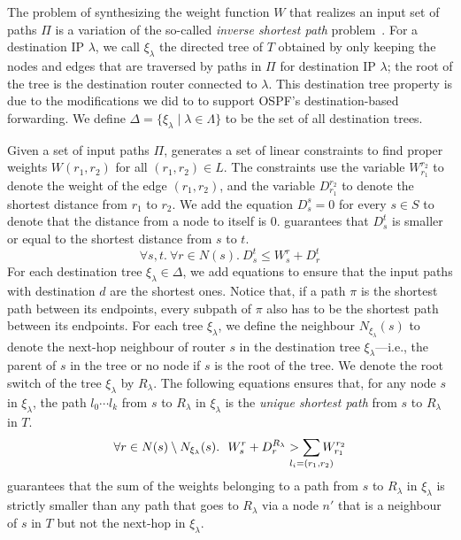 The problem of synthesizing the weight function $W$ that
realizes an input set of paths $\Pi$ is
a
variation of the so-called {\em inverse shortest path} 
problem~\cite{isp}. 
For a destination IP $\lambda$, we call $\xi_\lambda$ 
the directed tree of $T$ 
obtained by only keeping the nodes and edges 
that are traversed by paths in $\Pi$ for 
destination IP $\lambda$; the root of the tree
is the destination router connected to $\lambda$. 
 This destination tree
 property is due to the modifications we did to \genesis
 to support OSPF's destination-based forwarding. We
 define $\Delta=\{\xi_\lambda\mid \lambda \in \Lambda\}$ to be 
the set of all destination trees. 

Given a set of input paths $\Pi$, \name 
generates a set of linear constraints to 
find proper weights $W(r_1,r_2)$ 
for all $(r_1, r_2) \in L$.
The constraints use the variable $W_{r_1}^{r_2}$
to denote the weight of the edge $(r_1, r_2)$, and the variable
$D_{r_1}^{r_2}$ to denote the 
shortest distance from $r_1$ to $r_2$.
We add the equation $D_{s}^{s} = 0$ 
for every $s\in S$ to denote that the distance
from a node to itself is $0$.
 guarantees that $D_{s}^{t}$ is smaller or equal to
the shortest distance from $s$ to $t$.
\begin{equation} \label{eq:dist}
\forall s, t. ~\forall r \in N(s).~
D_s^t \leq W_s^r + D_r^t
\end{equation}
For each destination tree $\xi_\lambda\in\Delta$, we add equations to ensure 
that the input paths with destination $d$ are the shortest ones.
Notice that, if a path $\pi$
is the shortest path between its endpoints, every 
subpath of $\pi$ also has to be the shortest path between its endpoints.
For each tree $\xi_\lambda$, we define the neighbour
 $N_{\xi_\lambda}(s)$ to denote the 
next-hop neighbour of router $s$ in the destination tree $\xi_\lambda$---i.e., the parent
of $s$ in the tree or no node if $s$ is the root of the tree. We denote the
root switch of the tree $\xi_\lambda$ by $R_\lambda$.
The following equations ensures that, for any node $s$ in 
$\xi_\lambda$, 
the path $l_0\cdots l_k$ from $s$ to $R_\lambda$ 
in $\xi_\lambda$ is the 
\emph{unique shortest path} from $s$ to $R_\lambda$ in $T$.
\begin{equation} \label{eq:uniq1}
\forall r \in N(s) \setminus N_{\xi_\lambda}(s).~~
W_{s}^{r}+ D_{r}^{R_\lambda} > \sum_{\mathclap{\substack{l_i=(r_1,r_2)}}} 
W_{r_1}^{r_2}
\end{equation}
 guarantees that 
the sum of the weights belonging to a path from $s$ to $R_\lambda$ in $\xi_\lambda$ 
is strictly smaller than 
any path that goes to $R_\lambda$ via 
a node $n'$ that is a neighbour of $s$ in $T$ but not 
the next-hop in $\xi_\lambda$.


